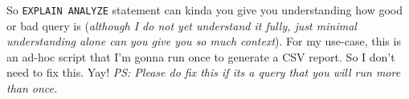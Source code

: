 So \texttt{EXPLAIN ANALYZE} statement can kinda you give you understanding how good or bad query is (\textit{although I do not yet understand it fully, just minimal understanding alone can you give you so much context}). For my use-case, this is an ad-hoc script that I'm gonna run once to generate a CSV report. So I don't need to fix this. Yay! \textit{PS: Please do fix this if its a query that you will run more than once.}
